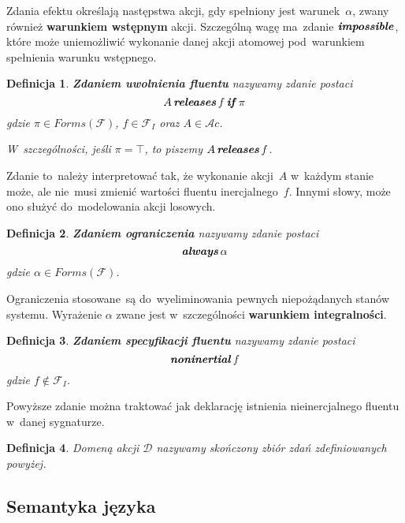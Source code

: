 \documentclass[11pt,a4paper]{article}
\newtheorem{defn}{Definicja}
\DeclareMathOperator{\If}{\textbf{\textit{if}}}
\DeclareMathOperator{\Impossible}{\textbf{\textit{impossible}}}
\DeclareMathOperator{\Releases}{\textbf{\textit{releases}}}
\DeclareMathOperator{\Always}{\textbf{\textit{always}}}
\DeclareMathOperator{\Noninertial}{\textbf{\textit{noninertial}}}
\begin{document}
Zdania efektu określają następstwa akcji, gdy spełniony jest warunek~$\alpha$, zwany również \textbf{warunkiem wstępnym} akcji.
Szczególną wagę ma~zdanie $\Impossible$, które może uniemożliwić wykonanie danej akcji atomowej pod~warunkiem spełnienia warunku wstępnego.

\begin{defn}
    \textbf{Zdaniem uwolnienia fluentu} nazywamy zdanie postaci
    $$ A \Releases f \If \pi $$
    gdzie $\pi \in Forms(\mathcal{F})$, $f \in \mathcal{F}_I$ oraz $A \in \mathcal{A}c$.

    W~szczególności, jeśli $\pi = \top$, to piszemy $A \Releases f$.
\end{defn}

Zdanie to~należy interpretować tak, że wykonanie akcji~$A$ w~każdym stanie może, ale nie~musi zmienić wartości fluentu inercjalnego~$f$.
Innymi słowy, może ono służyć do~modelowania akcji losowych.

\begin{defn}
    \textbf{Zdaniem ograniczenia} nazywamy zdanie postaci
    $$ \Always \alpha $$
    gdzie $\alpha \in Forms(\mathcal{F})$.
\end{defn}

Ograniczenia stosowane~są do~wyeliminowania pewnych niepożądanych stanów systemu.
Wyrażenie $\alpha$ zwane jest w~szczególności \textbf{warunkiem integralności}.

\begin{defn}
    \textbf{Zdaniem specyfikacji fluentu} nazywamy zdanie postaci
    $$ \Noninertial f $$
    gdzie $f \notin \mathcal{F}_I$. 
\end{defn}

Powyższe zdanie można traktować jak deklarację istnienia nieinercjalnego fluentu w~danej sygnaturze.

\begin{defn}
    \label{defn:action-domain}
    Domeną akcji $\mathcal{D}$ nazywamy skończony zbiór zdań zdefiniowanych powyżej.
\end{defn}

\subsection{Semantyka języka}
\end{document}
